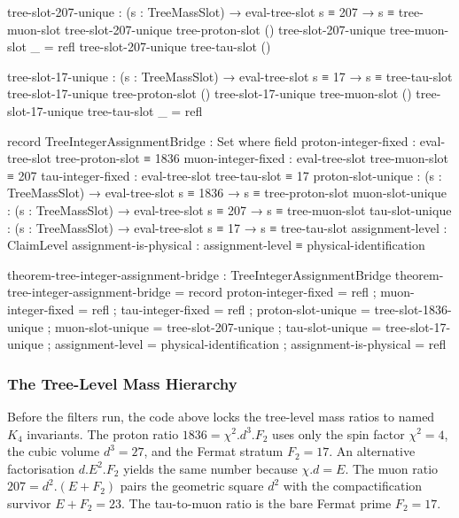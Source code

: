 \documentclass[11pt,a4paper]{book}
\def\cdot{.}%
\begin{document}
\begin{code}
tree-slot-207-unique :
  (s : TreeMassSlot) →
  eval-tree-slot s ≡ 207 →
  s ≡ tree-muon-slot
tree-slot-207-unique tree-proton-slot ()
tree-slot-207-unique tree-muon-slot   _ = refl
tree-slot-207-unique tree-tau-slot    ()

tree-slot-17-unique :
  (s : TreeMassSlot) →
  eval-tree-slot s ≡ 17 →
  s ≡ tree-tau-slot
tree-slot-17-unique tree-proton-slot ()
tree-slot-17-unique tree-muon-slot   ()
tree-slot-17-unique tree-tau-slot    _ = refl

record TreeIntegerAssignmentBridge : Set where
  field
    proton-integer-fixed : eval-tree-slot tree-proton-slot ≡ 1836
    muon-integer-fixed   : eval-tree-slot tree-muon-slot ≡ 207
    tau-integer-fixed    : eval-tree-slot tree-tau-slot ≡ 17
    proton-slot-unique   : (s : TreeMassSlot) → eval-tree-slot s ≡ 1836 → s ≡ tree-proton-slot
    muon-slot-unique     : (s : TreeMassSlot) → eval-tree-slot s ≡ 207 → s ≡ tree-muon-slot
    tau-slot-unique      : (s : TreeMassSlot) → eval-tree-slot s ≡ 17 → s ≡ tree-tau-slot
    assignment-level     : ClaimLevel
    assignment-is-physical : assignment-level ≡ physical-identification

theorem-tree-integer-assignment-bridge : TreeIntegerAssignmentBridge
theorem-tree-integer-assignment-bridge = record
  { proton-integer-fixed   = refl
  ; muon-integer-fixed     = refl
  ; tau-integer-fixed      = refl
  ; proton-slot-unique     = tree-slot-1836-unique
  ; muon-slot-unique       = tree-slot-207-unique
  ; tau-slot-unique        = tree-slot-17-unique
  ; assignment-level       = physical-identification
  ; assignment-is-physical = refl }
\end{code}

\subsubsection*{The Tree-Level Mass Hierarchy}

Before the filters run, the code above locks the tree-level mass ratios
to named $K_4$ invariants.  The proton ratio $1836 = \chi^2 \cdot d^3 \cdot F_2$
uses only the spin factor $\chi^2 = 4$, the cubic volume $d^3 = 27$,
and the Fermat stratum $F_2 = 17$.  An alternative factorisation
$d \cdot E^2 \cdot F_2$ yields the same number because $\chi \cdot d = E$.
The muon ratio $207 = d^2 \cdot (E + F_2)$ pairs the geometric square $d^2$
with the compactification survivor $E + F_2 = 23$.
The tau-to-muon ratio is the bare Fermat prime $F_2 = 17$.
\end{document}
